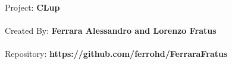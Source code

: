 
Project: \textbf{CLup} \\
\\
Created By: \textbf{Ferrara Alessandro and Lorenzo Fratus} \\
\\
Repository: \textbf{https://github.com/ferrohd/FerraraFratus}\\
